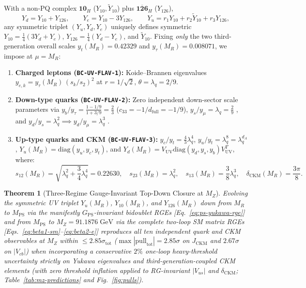 \documentclass[11pt,a4paper]{article}
\newtheorem{theorem}{Theorem}[section]
\begin{document}
With a non-PQ complex $\mathbf{10}_H$ ($Y_{10}, \tilde{Y}_{10}$) plus $\overline{\mathbf{126}}_H$ ($Y_{126}$),
\begin{equation}
Y_d = Y_{10} + Y_{126}, \qquad Y_e = Y_{10} - 3Y_{126}, \qquad Y_u = r_1 Y_{10} + r_2 \tilde{Y}_{10} + r_3 Y_{126},
\label{eq:complex-spin10}
\end{equation}
any symmetric triplet $(Y_u, Y_d, Y_e)$ uniquely defines symmetric $Y_{10} = \frac{1}{4}(3Y_d + Y_e)$, $Y_{126} = \frac{1}{4}(Y_d - Y_e)$, and $\tilde{Y}_{10}$. Fixing \emph{only} the two third-generation overall scales $y_t(M_R) = 0.42329$ and $y_\tau(M_R) = 0.008071$, we impose at $\mu = M_R$:
\begin{enumerate}[label=(\alph*),leftmargin=1.8em,itemsep=2pt]
\item \textbf{Charged leptons (\texttt{BC-UV-FLAV-1}):} Koide--Brannen eigenvalues $y_{e,k} = y_\tau(M_R)\,(s_k / s_2)^2$ at $r = 1/\sqrt{2}$, $\theta = \lambda_q = 2/9$.
\item \textbf{Down-type quarks (\texttt{BC-UV-FLAV-2}):} Zero independent down-sector scale parameters via $y_b / y_\tau = \frac{1 - 1/9}{1 + 3/9} = \frac{2}{3}$ ($c_{33} = -1/d_{\mathrm{full}} = -1/9$), $y_s / y_\mu = \lambda_q = \frac{2}{9}$ \cite{AntuschSpinrath2009}, and $y_d / y_s = \lambda_q^2 \implies y_d / y_\mu = \lambda_q^3$ \cite{GattoSartoriTonin1968}.
\item \textbf{Up-type quarks and CKM (\texttt{BC-UV-FLAV-3}):} $y_c / y_t = \frac{4}{3}\lambda_q^4$, $y_u / y_t = \lambda_q^8 = \lambda_q^{d_A}$, $Y_u(M_R) = \mathrm{diag}(y_u, y_c, y_t)$, and $Y_d(M_R) = V_{\mathrm{UV}} \mathrm{diag}(y_d, y_s, y_b) V_{\mathrm{UV}}^T$, where:
\begin{equation}
s_{12}(M_R) = \sqrt{\lambda_q^2 + \frac{3}{4}\lambda_q^4} = 0.22630, \quad
s_{23}(M_R) = \lambda_q^2, \quad
s_{13}(M_R) = \frac{3}{8}\lambda_q^3, \quad
\delta_{\mathrm{CKM}}(M_R) = \frac{3\pi}{8}.
\label{eq:uv-ckm-boundary}
\end{equation}
\end{enumerate}

\begin{theorem}[Three-Regime Gauge-Invariant Top-Down Closure at $M_Z$]
\label{thm:topdown-closure}
Evolving the symmetric UV triplet $Y_u(M_R)$, $Y_{10}(M_R)$, and $Y_{126}(M_R)$ down from $M_R$ to $M_{\mathrm{PS}}$ via the manifestly $G_{\mathrm{PS}}$-invariant bidoublet RGEs [Eq.~\eqref{eq:ps-yukawa-rge}] and from $M_{\mathrm{PS}}$ to $M_Z = 91.1876\;\mathrm{GeV}$ via the complete two-loop SM matrix RGEs [Eqs.~\eqref{eq:beta1-sm}--\eqref{eq:beta2-e}] reproduces all ten independent quark and CKM observables at $M_Z$ within $\le 2.85\sigma_{\mathrm{tot}}$ ($\max|\mathrm{pull}_{\mathrm{tot}}| = 2.85\sigma$ on $J_{\mathrm{CKM}}$ and $2.67\sigma$ on $|V_{cb}|$) when incorporating a conservative $2\%$ one-loop heavy-threshold uncertainty strictly on Yukawa eigenvalues and third-generation-coupled CKM elements (with zero threshold inflation applied to RG-invariant $|V_{us}|$ and $\delta_{\mathrm{CKM}}$; Table~\ref{tab:mz-predictions} and Fig.~\ref{fig:pulls}).
\end{theorem}
\end{document}
